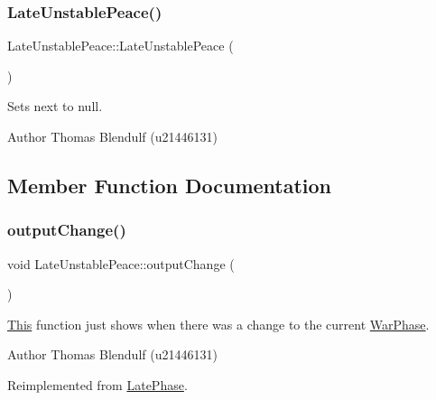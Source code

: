 \subsubsection{\texorpdfstring{LateUnstablePeace()}{LateUnstablePeace()}}
{\footnotesize\ttfamily Late\+Unstable\+Peace\+::\+Late\+Unstable\+Peace (\begin{DoxyParamCaption}{ }\end{DoxyParamCaption})}



Sets next to null. 

\begin{DoxyAuthor}{Author}
Thomas Blendulf (u21446131) 
\end{DoxyAuthor}


\subsection{Member Function Documentation}
\mbox{\label{class_late_unstable_peace_a5cd4d50424017c5666386fc95e4bf0ae}} 
\subsubsection{\texorpdfstring{outputChange()}{outputChange()}}
{\footnotesize\ttfamily void Late\+Unstable\+Peace\+::output\+Change (\begin{DoxyParamCaption}{ }\end{DoxyParamCaption})\hspace{0.3cm}{\ttfamily [virtual]}}



\mbox{\hyperlink{class_this}{This}} function just shows when there was a change to the current \mbox{\hyperlink{class_war_phase}{War\+Phase}}. 

\begin{DoxyAuthor}{Author}
Thomas Blendulf (u21446131) 
\end{DoxyAuthor}


Reimplemented from \mbox{\hyperlink{class_late_phase_a5df8ed1819ba8a826b923f7f3c349245}{Late\+Phase}}.

